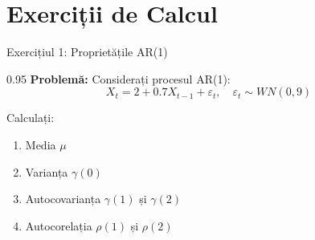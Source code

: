 \documentclass[9pt, aspectratio=169, t]{beamer}
\begin{document}
\section{Exerciții de Calcul}

\begin{frame}{Exercițiul 1: Proprietățile AR(1)}
    \begin{cminipage}{0.95\textwidth}
    \textbf{Problemă:} Considerați procesul AR(1):
    $$X_t = 2 + 0.7 X_{t-1} + \varepsilon_t, \quad \varepsilon_t \sim WN(0, 9)$$

    Calculați:
    \begin{enumerate}\setlength{\itemsep}{0pt}
        \item Media $\mu$
        \item Varianța $\gamma(0)$
        \item Autocovarianța $\gamma(1)$ și $\gamma(2)$
        \item Autocorelația $\rho(1)$ și $\rho(2)$
    \end{enumerate}
    \end{cminipage}
\end{frame}
\end{document}

